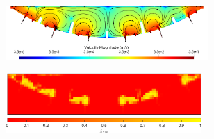         \begin{figure}
            \vspace{-1.5cm}
            \begin{centering}
                \vspace{4mm}
                \begin{subfigure}{\textwidth}
                    \begin{centering}
                        \includegraphics[width=0.85\textwidth]{diagrams/results-mri/simulated-placenta/simulated-placenta-velocity.png}
                        \caption{}
                    \end{centering}
                \end{subfigure}
                \begin{subfigure}{\textwidth}
                    \begin{centering}
                        \includegraphics[width=0.82\textwidth]{diagrams/results-mri/fits/2D_placenta_ivim_1.png}
                        \caption{}
                        \label{fig:mri-ivim:simulated}
                    \end{centering}
                \end{subfigure}
                \begin{subfigure}{0.4\textwidth}
                    \begin{centering}

\end{centering}
\end{subfigure}
\end{centering}
\end{figure}
